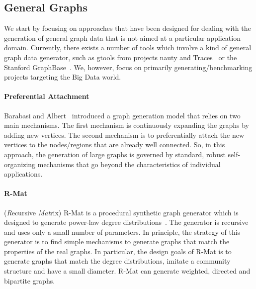 \subsection{General Graphs}
\label{sec:generators_general}

We start by focusing on approaches that have been designed for dealing with the generation of general graph
data that is not aimed at a particular application domain. Currently, there exists a
number of tools which involve a kind of general graph data generator, such as
gtools from projects nauty and Traces~\cite{gtools} or the Stanford
GraphBase~\cite{GraphBase}. We, however, focus on primarily
generating/benchmarking projects targeting the Big Data world.


\paragraph {Preferential Attachment} Barabasi and Albert~\cite{Barabasi99emergenceScaling} introduced a graph generation model that relies on two main mechanisms. The first mechanism is continuously expanding the graphs by adding new vertices. The second mechanism is to preferentially attach the new vertices   to the nodes/regions that are already well connected. So, in this approach, the generation of large graphs is governed by standard, robust self-organizing mechanisms that go beyond the characteristics of individual applications.

\paragraph {R-Mat} (\emph{R}ecursive \emph{Mat}rix) R-Mat is a procedural synthetic graph generator which is designed to generate power-law degree
distributions~\cite{DBLP:conf/sdm/ChakrabartiZF04}.
The generator is recursive and uses only a small number of parameters.
In principle, the strategy of this generator is to find simple mechanisms to generate graphs that match
the properties of the real graphs. In particular, the design goals of R-Mat is to generate graphs that match the degree distributions, imitate a community structure and have a small diameter. R-Mat can generate weighted, directed and bipartite graphs.


